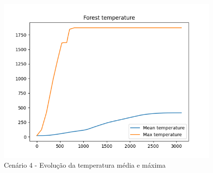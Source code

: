 \begin{figure}[H]
    \centering
    \includegraphics[width=\textwidth]{src/runs/scenario4/temperature.png}
    \caption{Cenário 4 - Evolução da temperatura média e máxima}
    \label{fig:S4Temp}
\end{figure}